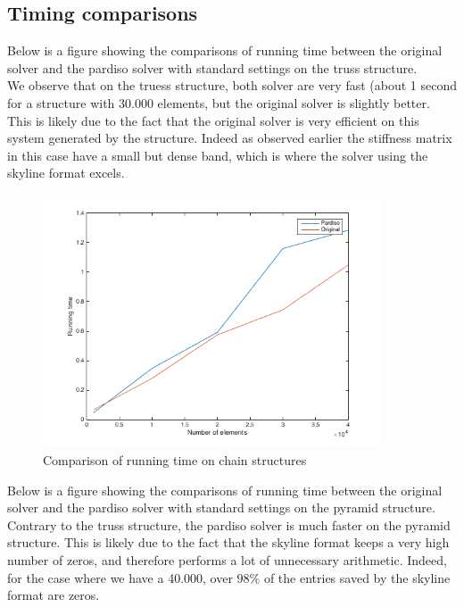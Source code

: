 \documentclass[11pt]{article}
\begin{document}
\subsection{Timing comparisons}
Below is a figure showing  the comparisons of running time between the original solver and the pardiso solver with standard settings on the truss structure. \\

We observe that on the truess structure, both solver are very fast (about 1 second for a structure with 30.000 elements, but the original solver is slightly better. This is likely due to the fact that the original solver is very efficient on this system generated by the structure. Indeed as observed earlier the stiffness matrix in this case have a small but dense band, which is where the solver using the skyline format excels.


\begin{figure}[H]
\begin{center}

\includegraphics[width=10cm]{chainplot}
\caption{Comparison of running time on chain structures}
\label{fig:pyr_comp}
\end{center}
\end{figure}

Below is a figure showing  the comparisons of running time between the original solver and the pardiso solver with standard settings on the pyramid structure. \\

Contrary to the truss structure, the pardiso solver is much faster on the pyramid structure. This is likely due to the fact that the skyline format keeps a very high number of zeros, and therefore performs a lot of unnecessary arithmetic. Indeed, for the case where we have a 40.000, over $98\%$ of the entries saved by the skyline format are zeros.
\end{document}
